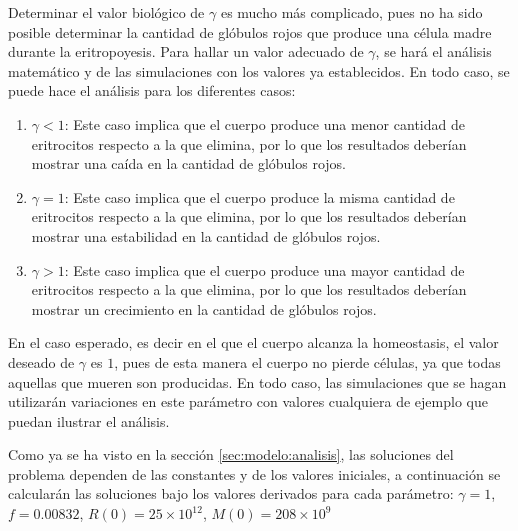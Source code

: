 Determinar el valor biológico de $\gamma$ es mucho más complicado, pues no ha sido posible determinar la cantidad de glóbulos rojos que produce una célula madre durante la eritropoyesis. Para hallar un valor adecuado de $\gamma$, se hará el análisis matemático y de las simulaciones con los valores ya establecidos. En todo caso, se puede hace el análisis para los diferentes casos:
\begin{enumerate}
    \item  $\gamma<1$: Este caso implica que el cuerpo produce una menor cantidad de eritrocitos respecto a la que elimina, por lo que los resultados deberían mostrar una caída en la cantidad de glóbulos rojos.
    \item $\gamma=1$: Este caso implica que el cuerpo produce la misma cantidad de eritrocitos respecto a la que elimina, por lo que los resultados deberían mostrar una estabilidad en la cantidad de glóbulos rojos.
    \item  $\gamma>1$: Este caso implica que el cuerpo produce una mayor cantidad de eritrocitos respecto a la que elimina, por lo que los resultados deberían mostrar un crecimiento en la cantidad de glóbulos rojos.
\end{enumerate}

En el caso esperado, es decir en el que el cuerpo alcanza la homeostasis, el valor deseado de $\gamma$ es $1$, pues de esta manera el cuerpo no pierde células, ya que todas aquellas que mueren son producidas. En todo caso, las simulaciones que se hagan utilizarán variaciones en este parámetro con valores cualquiera de ejemplo que puedan ilustrar el análisis.

Como ya se ha visto en la sección \ref{sec:modelo:analisis}, las soluciones del problema dependen de las constantes y de los valores iniciales, a continuación se calcularán las soluciones bajo los valores derivados para cada parámetro: $\gamma = 1$, $f = 0.00832$, $R(0)=25\times 10^{12}$, $M(0)=208\times 10^{9}$ 

